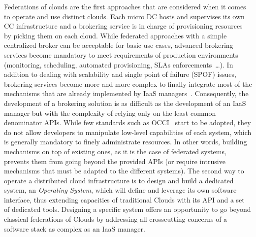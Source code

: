 Federations of clouds are the first approaches that are considered when it comes to operate and use distinct clouds. Each micro DC hosts and
supervises its own CC infrastructure and a brokering service is in charge of provisioning resources by picking them on each cloud. While federated
approaches with a simple centralized broker can be acceptable for basic use cases, advanced brokering services become mandatory to meet requirements
of production environments (monitoring, scheduling, automated provisioning, SLAs enforcements~\ldots). In addition to dealing with scalability and
single point of failure (SPOF) issues, brokering services become more and more complex to finally integrate most of the mechanisms that are already
implemented by IaaS managers~\cite{buyya:2010,houidi:2011}. Consequently, the development of a brokering solution is as difficult as the development
of an IaaS manager but with the complexity of relying only on the least common denominator APIs. While few standards such as OCCI~\cite{loutas:2010}
start to be adopted, they do not allow developers to manipulate low-level capabilities of each system, which is generally mandatory to finely
administrate resources. In other words, building mechanisms on top of existing ones, as it is the case of federated systems, prevents them from going
beyond the provided APIs (or require intrusive mechanisms that must be adapted to the different systems).
%
The second way to operate a distributed cloud infrastructure is to design and build a dedicated system, \ie an \emph{Operating System},
which %
will define and leverage its own software interface, thus extending capacities of traditional Clouds with its API and a set of dedicated
tools. Designing a specific system offers an opportunity to go beyond classical federations of Clouds by addressing all crosscutting concerns of a
software stack as complex as an IaaS manager.

